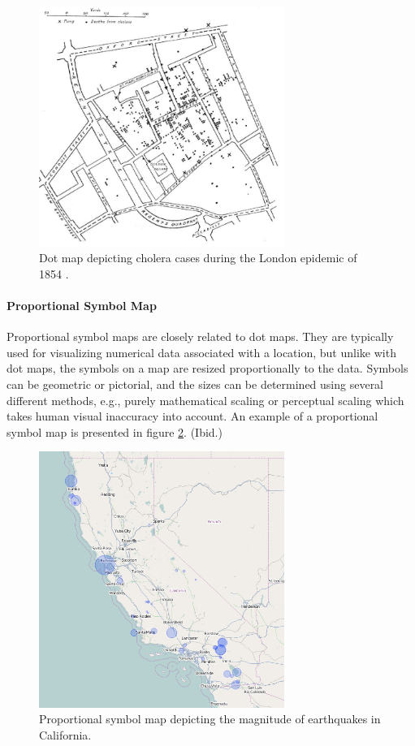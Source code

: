 \begin{figure}[htbp]
  \begin{center}
    \includegraphics[width=8cm]{images/dot-example.jpg}
    \caption{Dot map depicting cholera cases during the London epidemic of 1854 \citep{snow_cholera_1854}.}
    \label{fig:dot}
  \end{center}
\end{figure}

\paragraph{Proportional Symbol Map}

Proportional symbol maps are closely related to dot maps. They are typically used for visualizing numerical data associated with a location, but unlike with dot maps, the symbols on a map are resized proportionally to the data. Symbols can be geometric or pictorial, and the sizes can be determined using several different methods, e.g., purely mathematical scaling or perceptual scaling which takes human visual inaccuracy into account. An example of a proportional symbol map is presented in figure \ref{fig:proportionalsymbol}. (Ibid.)

\begin{figure}[htbp]
  \begin{center}
    \includegraphics[width=8cm]{images/proportionalsymbol-example.png}
    \caption{Proportional symbol map depicting the magnitude of earthquakes in California.}
    \label{fig:proportionalsymbol}
  \end{center}
\end{figure}

